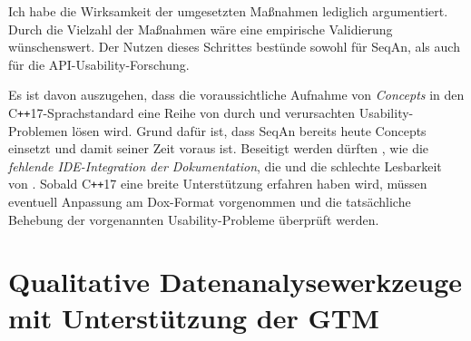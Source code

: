 Ich habe die Wirksamkeit der umgesetzten Maßnahmen lediglich argumentiert. Durch die Vielzahl der Maßnahmen wäre eine empirische Validierung wünschenswert. Der Nutzen dieses Schrittes bestünde sowohl für SeqAn, als auch für die API-Usability-Forschung.

Es ist davon auszugehen, dass die voraussichtliche Aufnahme von \textit{Concepts} in den C\texttt{++}17-Sprachstandard \citep{Schmidt:2014tf} eine Reihe von durch  und  verursachten Usability-Problemen lösen wird. Grund dafür ist, dass SeqAn bereits heute Concepts einsetzt und damit seiner Zeit voraus ist. Beseitigt werden dürften , wie die \textit{fehlende IDE-Integration der Dokumentation}, die  und die schlechte Lesbarkeit von . Sobald C\texttt{++}17 eine breite Unterstützung erfahren haben wird, müssen eventuell Anpassung am Dox-Format vorgenommen und die tatsächliche Behebung der vorgenannten Usability-Probleme überprüft werden.







\section{Qualitative Datenanalysewerkzeuge mit Unterstützung der GTM}


